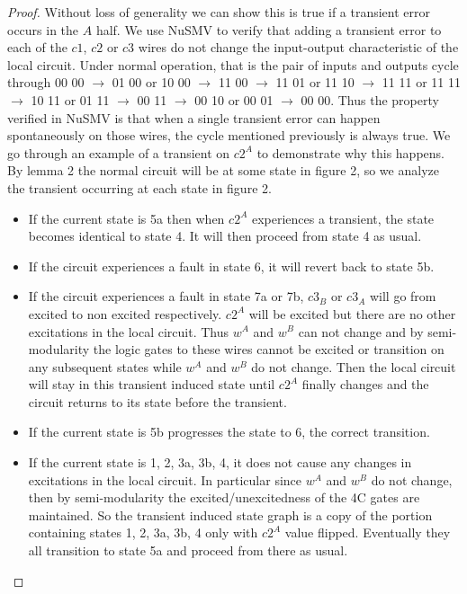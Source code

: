 \documentclass{article}
\begin{document}
\begin{proof}
Without loss of generality we can show this is true if a transient error occurs in the $A$ half.  We use NuSMV to verify that adding a transient error to each of the $c1$, $c2$ or $c3$ wires do not change the input-output characteristic of the local circuit.  Under normal operation, that is the pair of inputs and outputs cycle through 00 00 $\rightarrow$ 01 00 or 10 00 $\rightarrow$ 11 00 $\rightarrow$ 11 01 or 11 10 $\rightarrow$ 11 11 or 11 11 $\rightarrow$ 10 11 or 01 11 $\rightarrow$ 00 11 $\rightarrow$ 00 10 or 00 01 $\rightarrow$ 00 00.  Thus the property verified in NuSMV is that when a single transient error can happen spontaneously on those wires, the cycle mentioned previously is always true.    %
We go through an example of a transient on $c2^A$ to demonstrate why this happens.  By lemma 2 the normal circuit will be at some state in figure 2, so we analyze the transient occurring at each state in figure 2.
\begin{itemize}
	\item
      If the current state is 5a then when $c2^A$ experiences a transient, the state
 becomes identical to state 4.  It will then proceed from state 4 as usual.   
	\item
If the circuit experiences a fault in state 6, it will revert back to state 5b.  
	\item
If the circuit experiences a fault in state 7a or 7b, $c3_B$ or $c3_A$ will go from excited to non excited respectively.  $c2^A$ will be excited but there are no other excitations in the local circuit.  Thus $w^A$ and $w^B$ can not change and by semi-modularity the logic gates to these wires cannot be excited or transition on any subsequent states while $w^A$ and $w^B$ do not change.  Then the local circuit will stay in this transient induced state until $c2^A$ finally changes and the circuit returns to its state before the transient.
	\item
If the current state is 5b progresses the state to 6, the correct transition.
	\item
If the current state is 1, 2, 3a, 3b, 4, it does not cause any changes in excitations in the local circuit.  In particular since $w^A$ and $w^B$ do not change, then by semi-modularity the excited/unexcitedness of the 4C gates are maintained.  So the transient induced state graph is a copy of the portion containing states 1, 2, 3a, 3b, 4 only with $c2^A$ value flipped. Eventually they all transition to state 5a and proceed from there as usual.

\end{itemize}
\end{proof}
\end{document}
